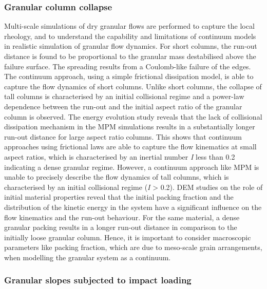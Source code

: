 \subsubsection*{Granular column collapse}

Multi-scale simulations of dry granular flows are performed to capture the 
local rheology, and to understand the capability and limitations of continuum 
models in realistic simulation of granular flow dynamics. For short columns, 
the run-out distance is found to be proportional to the granular mass 
destabilised above the failure surface. The spreading results from a 
Coulomb-like failure of the edges. The continuum approach, using a simple 
frictional dissipation model, is able to capture the flow dynamics of short 
columns. Unlike short columns, the collapse of tall columns is characterised by 
an initial collisional regime and a power-law dependence between the run-out 
and the initial aspect ratio of the granular column is observed. The energy 
evolution study reveals that the lack of collisional dissipation mechanism in 
the MPM simulations results in a substantially longer run-out distance for 
large aspect ratio columns. This 
shows that continuum approaches using frictional laws are able to capture the 
flow kinematics at small aspect ratios, which is characterised by an inertial 
number \textit{I} less than 0.2 indicating a dense granular regime. However, 
a continuum approach like MPM is unable to precisely describe the flow 
dynamics of tall columns, which is characterised by an initial collisional 
regime (\textit{I} > 0.2). DEM studies on the role of initial material 
properties 
reveal that the initial packing fraction and the distribution of the kinetic 
energy in the system have a significant influence on the flow kinematics and 
the run-out behaviour. For the same material, a dense granular packing results 
in a longer run-out distance in comparison to the initially loose granular 
column. Hence, it is important to consider macroscopic parameters like packing 
fraction, which are due to meso-scale grain arrangements, when modelling the 
granular system as a continuum.

\subsubsection*{Granular slopes subjected to impact loading}

